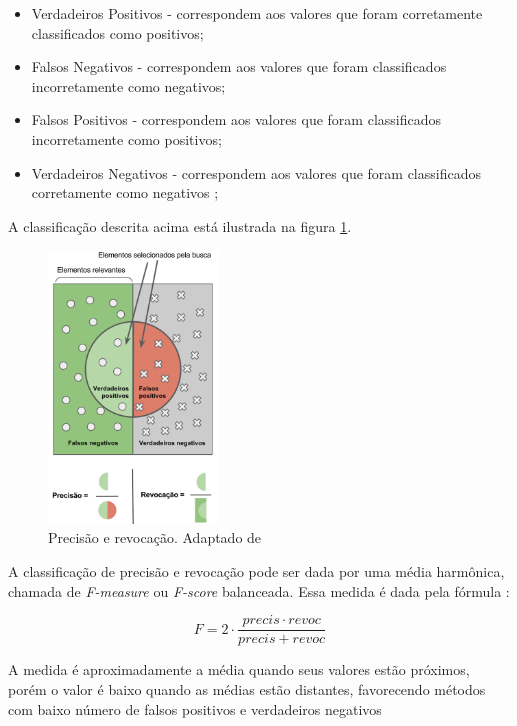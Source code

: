 \begin{document}
\begin{itemize}
 \item Verdadeiros Positivos - correspondem aos valores que foram corretamente classificados como positivos;
 \item Falsos Negativos - correspondem aos valores que foram classificados incorretamente como negativos;
 \item Falsos Positivos - correspondem aos valores que foram classificados incorretamente como positivos;
 \item Verdadeiros Negativos - correspondem aos valores que foram classificados corretamente como negativos \cite{WIKI_PREC_RECALL};
\end{itemize}

A classificação descrita acima está ilustrada na figura \ref{fig:PREC_RECALL}. 

\begin{figure}[ht]
\centering
\includegraphics[width=0.4\textwidth]{precision_recall.png}
\caption{Precisão e revocação. Adaptado de \cite{WIKI_PREC_RECALL}}
\label{fig:PREC_RECALL}
\end{figure}

A classificação de precisão e revocação pode ser dada por uma média harmônica, chamada de \textit{F-measure} ou \textit{F-score} balanceada. Essa medida é dada pela fórmula \cite{WIKI_PREC_RECALL}:

\begin{equation}
 F=2 \cdot \frac{precis \cdot revoc}{precis+revoc}
\end{equation}

A medida é aproximadamente a média quando seus valores estão próximos, porém o valor é baixo quando as médias estão distantes, favorecendo métodos com baixo número de falsos positivos e verdadeiros negativos \cite{WIKI_PREC_RECALL}
\end{document}
